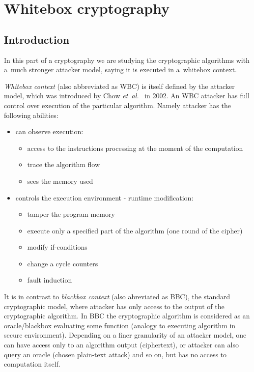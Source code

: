 \documentclass[11pt,oneside,final]{fithesis2}
\begin{document}
\chapter{Whitebox cryptography}
    
    \section{Introduction}    
    In this part of a cryptography we are studying the cryptographic algorithms with a~much stronger attacker model, saying it is executed in a~whitebox context. 

    \emph{Whitebox context} (also abbreviated as WBC) is itself defined by the attacker model, which was introduced by Chow \emph{et~al.}~\citep{Chow02white-boxcryptography} in 2002.
    An WBC attacker has full control over execution of the particular algorithm. Namely attacker has the following abilities:
    
    \begin{itemize}
	\item can observe execution:
	\begin{itemize}
	    \item access to the instructions processing at the moment of the computation
	    \item trace the algorithm flow
	    \item sees the memory used
	\end{itemize}
	\item controls the execution environment - runtime modification:
	\begin{itemize}
	    \item tamper the program memory
	    \item execute only a specified part of the algorithm (one round of the cipher)
	    \item modify if-conditions
	    \item change a cycle counters
	    \item fault induction
	\end{itemize}
    \end{itemize}
    
    It is in contrast to \emph{blackbox context} (also abreviated as BBC), the standard cryptographic model, where attacker has only access to the output of the cryptographic algorithm. 
    In BBC the cryptographic algorithm is considered as an oracle/blackbox evaluating some function (analogy to executing algorithm in secure environment).
    Depending on a finer granularity of an attacker model, one can have 
    access only to an algorithm output (ciphertext), or attacker can also query an oracle (chosen plain-text attack) and so on, but has no access to computation itself.
\end{document}

